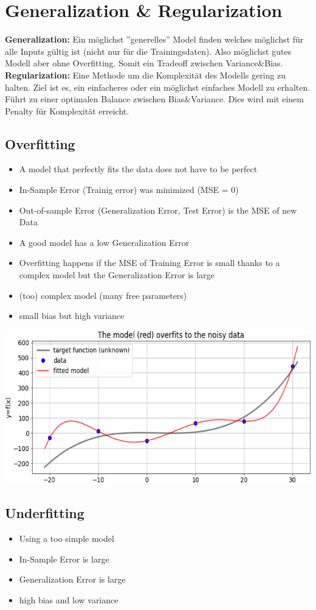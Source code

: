 \section{Generalization \& Regularization}
\textbf{Generalization:} Ein möglichst ''generelles'' Model finden welches möglichst für alle Inputs gültig ist (nicht nur für die Trainingsdaten). Also möglichst gutes Modell aber ohne Overfitting. Somit ein Tradeoff zwischen Variance\&Bias. \\  
\textbf{Regularization:} Eine Methode um die Komplexität des Modells gering zu halten. Ziel ist es, ein einfacheres oder ein möglichst einfaches Modell zu erhalten. Führt zu einer optimalen Balance zwischen Bias\&Variance. Dies wird mit einem Penalty für Komplexität erreicht.
\subsection{Overfitting}
\begin{itemize}
    \item A model that perfectly fits the data does not have to be perfect
    \item In-Sample Error (Trainig error) was minimized (MSE = 0)
    \item Out-of-sample Error (Generalization Error, Test Error) is the MSE of new Data
    \item A good model has a low Generalization Error
    \item Overfitting happens if the MSE of Training Error is small thanks to a complex model but the Generalization Error is large
    \item (too) complex model (many free parameters)
    \item small bias but high variance
\end{itemize}
\includegraphics[width=0.9\linewidth]{./img/overfitting.png}

\subsection{Underfitting}
\begin{itemize}
    \item Using a too simple model
    \item In-Sample Error is large
    \item Generalization Error is large
    \item high bias and low variance
\end{itemize}

